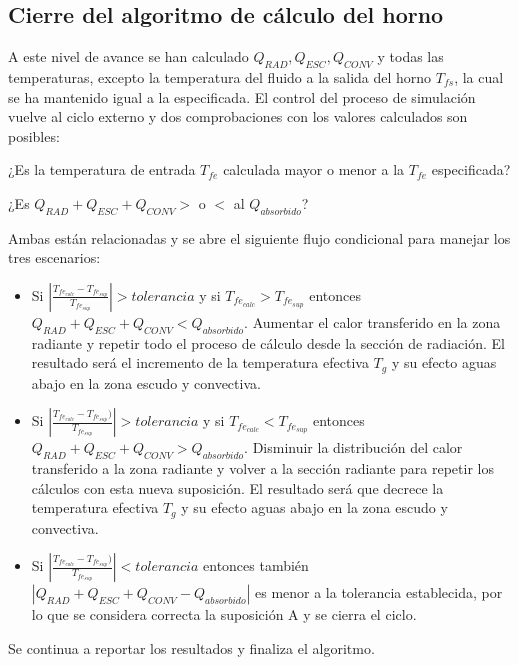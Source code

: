 \subsection{Cierre del algoritmo de cálculo del horno}
\par A este nivel de avance se han calculado $Q_{RAD}, Q_{ESC}, Q_{CONV}$ y todas las temperaturas, excepto la temperatura del fluido a la salida del horno $T_{fs}$, la cual se ha mantenido igual a la especificada. El control del proceso de simulación vuelve al ciclo externo y dos comprobaciones con los valores calculados son posibles:\\
\par ¿Es la temperatura de entrada $T_{fe}$ calculada mayor o menor a la $T_{fe}$ especificada?
\par ¿Es $Q_{RAD} + Q_{ESC} + Q_{CONV} >$ o $<$ al $Q_{absorbido}$?\\
\par Ambas están relacionadas y se abre el siguiente flujo condicional para manejar los tres escenarios:
\begin{itemize}
    \item Si $|\frac{T_{fe_{calc}} - T_{fe_{sup}}}{T_{fe_{sup}}} | > tolerancia$ y si $T_{fe_{calc}} > T_{fe_{sup}}$ entonces $Q_{RAD} + Q_{ESC} + Q_{CONV} < Q_{absorbido}$. Aumentar el calor transferido en la zona radiante y repetir todo el proceso de cálculo desde la sección de radiación. El resultado será el incremento de la temperatura efectiva $T_{g}$ y su efecto aguas abajo en la zona escudo y convectiva.
    \item Si $|\frac{T_{fe_{calc}} - T_{fe_{sup}})}{T_{fe_{sup}}} | > tolerancia$ y si $T_{fe_{calc}} < T_{fe_{sup}}$ entonces $Q_{RAD} + Q_{ESC} + Q_{CONV} > Q_{absorbido}$. Disminuir la distribución del calor transferido a la zona radiante y volver a la sección radiante para repetir los cálculos con esta nueva suposición. El resultado será que decrece la temperatura efectiva $T_{g}$ y su efecto aguas abajo en la zona escudo y convectiva.
    \item Si $|\frac{T_{fe_{calc}} - T_{fe_{sup}})}{T_{fe_{sup}}} | < tolerancia$ entonces también $|Q_{RAD} + Q_{ESC} + Q_{CONV} - Q_{absorbido}|$ es menor a la tolerancia establecida, por lo que se considera correcta la suposición A y se cierra el ciclo.
\end{itemize}
\par Se continua a reportar los resultados y finaliza el algoritmo.